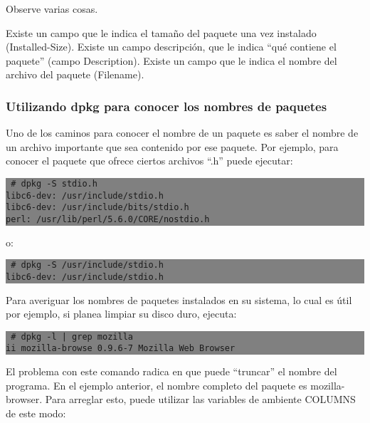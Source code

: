 \documentclass[12pt]{article}
\begin{document}
Observe varias cosas.

Existe un campo que le indica el tamaño del paquete una vez instalado (Installed-Size).
Existe un campo descripción, que le indica ``qué contiene el paquete'' (campo Description).
Existe un campo que le indica el nombre del archivo del paquete (Filename).



\subsubsection*{Utilizando dpkg para conocer los nombres de paquetes}

Uno de los caminos para conocer el nombre de un paquete es saber el nombre de un archivo importante que sea contenido por ese paquete. Por ejemplo, para conocer el paquete que ofrece ciertos archivos ``.h'' puede ejecutar:

\colorbox{grey}{\parbox[t]{0.95\linewidth}{ \vspace*{0.5cm} {\tt
     \# dpkg -S stdio.h\\
     libc6-dev: /usr/include/stdio.h\\
     libc6-dev: /usr/include/bits/stdio.h\\
     perl: /usr/lib/perl/5.6.0/CORE/nostdio.h\\
 } \vspace*{0.5cm} } } 

o:

\colorbox{grey}{\parbox[t]{0.95\linewidth}{ \vspace*{0.5cm} {\tt
     \# dpkg -S /usr/include/stdio.h \\
     libc6-dev: /usr/include/stdio.h \\
 } \vspace*{0.5cm} } } 

Para averiguar los nombres de paquetes instalados en su sistema, lo cual es útil por ejemplo, si planea limpiar su disco duro, ejecuta:

\colorbox{grey}{\parbox[t]{0.95\linewidth}{ \vspace*{0.5cm} {\tt
     \# dpkg -l | grep mozilla \\
     ii  mozilla-browse 0.9.6-7        Mozilla Web Browser \\
 } \vspace*{0.5cm} } } 

El problema con este comando radica en que puede ``truncar'' el nombre del programa. En el ejemplo anterior, el nombre completo del paquete es mozilla-browser. Para arreglar esto, puede utilizar las variables de ambiente COLUMNS de este modo:
\end{document}
